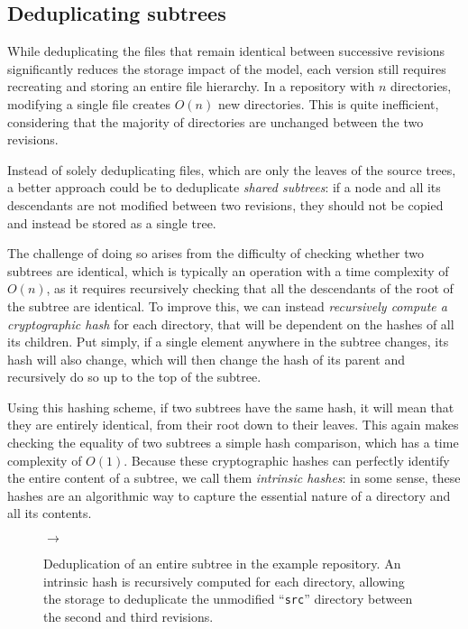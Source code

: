 \subsection{Deduplicating subtrees}%
\label{sec:deduplicating-subtrees}

While deduplicating the files that remain identical between successive
revisions significantly reduces the storage impact of the model, each version
still requires recreating and storing an entire file hierarchy. In a repository
with $n$ directories, modifying a single file creates $O(n)$ new directories.
This is quite inefficient, considering that the majority of directories are
unchanged between the two revisions.

Instead of solely deduplicating files, which are only the leaves of the source
trees, a better approach could be to deduplicate \emph{shared subtrees}: if a
node and all its descendants are not modified between two revisions, they
should not be copied and instead be stored as a single tree.

The challenge of doing so arises from the difficulty of checking whether two
subtrees are identical, which is typically an operation with a time complexity
of $O(n)$, as it requires recursively checking that all the descendants of the
root of the subtree are identical. To improve this, we can instead
\emph{recursively compute a cryptographic hash} for each directory, that will
be dependent on the hashes of all its children. Put simply, if a single element
anywhere in the subtree changes, its hash will also change, which will then
change the hash of its parent and recursively do so up to the top of the
subtree.

Using this hashing scheme, if two subtrees have the same hash, it will mean
that they are entirely identical, from their root down to their leaves. This
again makes checking the equality of two subtrees a simple hash comparison,
which has a time complexity of $O(1)$. Because these cryptographic hashes
can perfectly identify the entire content of a subtree, we call them
\emph{intrinsic hashes}: in some sense, these hashes are an algorithmic way to
capture the essential nature of a directory and all its contents.

\begin{figure}
    \centering
    \begin{subfigure}{.53\textwidth}
        \centering
        
    \end{subfigure}\hfill{\Huge $\rightarrow$}\hfill%
    \begin{subfigure}{.35\textwidth}
        \centering
        
    \end{subfigure}
    \caption{Deduplication of an entire subtree in the example repository. An
    intrinsic hash is recursively computed for each directory, allowing the
storage to deduplicate the unmodified ``\texttt{src}'' directory between the
second and third revisions.}%
    \label{fig:deduplicate-subtree}
\end{figure}

